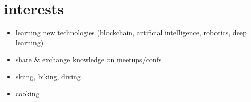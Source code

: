 \documentclass[]{friggeri-cv} %
\begin{document}

\section{\color{green}interests}
\begin{itemize}
\item learning new technologies (blockchain, artificial intelligence, robotics, deep learning)
\item share \& exchange knowledge on meetups/confs
\item skiing, biking, diving
\item cooking
\end{itemize}

\end{document}
